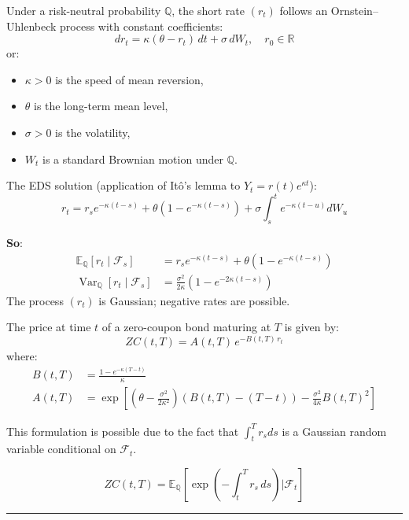 \begin{f}
	
	Under a risk-neutral probability \(\mathbb{Q}\), the short rate \((r_t)\) follows an Ornstein–Uhlenbeck process with constant coefficients:
	\[
	dr_t = \kappa(\theta - r_t)\, dt + \sigma\, dW_t, \quad r_0 \in \mathbb{R}
	\]
	or:
	\begin{itemize}[nosep]
		\item \(\kappa > 0\) is the speed of mean reversion,
		\item \(\theta\) is the long-term mean level,
		\item \(\sigma > 0\) is the volatility,
		\item \(W_t\) is a standard Brownian motion under \(\mathbb{Q}\).
	\end{itemize}
	
The EDS solution (application of Itô’s lemma to \(Y_{t}=r(t) e^{\kappa t}\)):
	\[
	r_t = r_s e^{-\kappa(t-s)} + \theta(1 - e^{-\kappa(t-s)}) + \sigma \int_s^t e^{-\kappa(t-u)} dW_u
	\]
	
	\textbf{So}:
	\[
	\begin{aligned}
		\mathbb{E}_\mathbb{Q}[r_t \mid \mathcal{F}_s] &= r_s e^{-\kappa(t-s)} + \theta(1 - e^{-\kappa(t-s)}) \\
		\operatorname{Var}_\mathbb{Q}[r_t \mid \mathcal{F}_s] &= \frac{\sigma^2}{2\kappa} \left(1 - e^{-2\kappa(t-s)}\right)
	\end{aligned}
	\]
The process \((r_t)\) is Gaussian; negative rates are possible.
	
\end{f}

\begin{f}

The price at time \(t\) of a zero-coupon bond maturing at \(T\) is given by:
\[
ZC(t, T) = A(t, T) \, e^{-B(t, T)\, r_t}
\]
where:
\[
\begin{aligned}
	B(t, T) &= \frac{1 - e^{-\kappa(T - t)}}{\kappa} \\
	A(t, T) &= \exp \left[ \left(\theta - \frac{\sigma^2}{2\kappa^2}\right) (B(t, T) - (T - t)) - \frac{\sigma^2}{4\kappa} B(t, T)^2 \right]
\end{aligned}
\]

This formulation is possible due to the fact that \(\int_t^T r_s ds\) is a Gaussian random variable conditional on \(\mathcal{F}_t\).

\[
ZC(t, T) = \mathbb{E}_\mathbb{Q} \left[ \exp\left( -\int_t^T r_s\, ds \right) \Big| \mathcal{F}_t \right]
\]

\end{f}
\hrule

